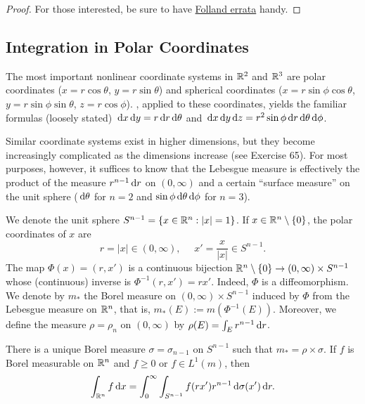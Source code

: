 \documentclass[12pt]{article} %
\begin{document}
\begin{proof}
    For those interested, be sure to have \href{https://sites.math.washington.edu//~folland/Homepage/oldreals.pdf}{Folland errata} handy.
\end{proof}

\subsection{Integration in Polar Coordinates}

The most important nonlinear coordinate systems in $\mathbb{R}^2$ and $\mathbb{R}^3$ are polar coordinates ($x = r \cos \theta$, $y = r \sin \theta$) and spherical coordinates ($x = r \sin \phi \cos \theta$, $y = r \sin \phi \sin \theta$, $z = r \cos \phi$). , applied to these coordinates, yields the familiar formulas (loosely stated) $\, \mathrm{d} x \, \mathrm{d} y = r \, \mathrm{d} r \, \mathrm{d} \theta$ and $\, \mathrm{d} x \, \mathrm{d} y \, \mathrm{d} z = r^2 \sin \phi \, \mathrm{d} r \, \mathrm{d} \theta \, \mathrm{d} \phi$. 

Similar coordinate systems exist in higher dimensions, but they become increasingly complicated as the dimensions increase (see Exercise 65). For most purposes, however, it suffices to know that the Lebesgue measure is effectively the product of the measure $r^{n-1} \, \mathrm{d} r$ on $(0, \infty)$ and a certain ``surface measure'' on the unit sphere ($\, \mathrm{d} \theta$ for $n = 2$ and $\sin \phi \, \mathrm{d}\theta \, \mathrm{d}\phi$ for $n = 3$).

\begin{definition}
    We denote the unit sphere $S^{n-1} = \{x \in \mathbb{R}^n : |x| = 1\}$. If $x \in \mathbb{R}^n \setminus \{0\}$, the polar coordinates of $x$ are \[r = |x| \in (0, \infty), \ \ \ \ \ \ x' = \frac{x}{|x|} \in S^{n-1}.\] The map $\Phi(x) = (r, x')$ is a continuous bijection $\mathbb{R}^n \setminus \{0\} \to (0, \infty) \times S^{n-1}$ whose (continuous) inverse is $\Phi^{-1}(r, x') = rx'$. Indeed, $\Phi$ is a diffeomorphism. We denote by $m_*$ the Borel measure on $(0, \infty) \times S^{n-1}$ induced by $\Phi$ from the Lebesgue measure on $\mathbb{R}^n$, that is, $m_*(E) := m(\Phi^{-1}(E))$. Moreover, we define the measure $\rho = \rho_n$ on $(0, \infty)$ by $\rho(E) = \int_E r^{n-1}\, \mathrm{d} r$.
\end{definition}

\begin{theorem}
    There is a unique Borel measure $\sigma = \sigma_{n-1}$ on $S^{n-1}$ such that $m_* = \rho \times \sigma$. If $f$ is Borel measurable on $\mathbb{R}^n$ and $f \geq 0$ or $f \in L^1(m)$, then \begin{align}\label{eq:2.50}
        \int_{\mathbb{R}^n}f \, \mathrm{d} x = \int_0^\infty \int_{S^{n-1}} f(rx') r^{n-1} \, \mathrm{d} \sigma(x') \, \mathrm{d} r.
    \end{align}
\end{theorem}
\end{document}

